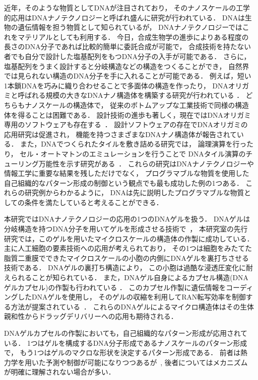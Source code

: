 近年，そのような物質としてDNAが注目されており，
そのナノスケールの工学的応用はDNAナノテクノロジーと呼ばれ盛んに研究が行われている．
DNAは生物の遺伝情報を担う物質として知られているが，
DNAナノテクノロジーではこれをマテリアルとしても利用する．
今日，合成生物学の進歩によりある程度の長さのDNA分子であれば比較的簡単に委託合成が可能で，
合成技術を持たない者でも自分で設計した塩基配列をもつDNA分子の入手が可能である．
さらに，塩基配列をうまく設計すると分岐構造などの構造をつくることができ，
自然界では見られない構造のDNA分子を手に入れることが可能である．
例えば，短い1本鎖DNAを巧みに織り合わせることで多面体の構造を作ったり\cite{chen1991synthesis}，
DNAオリガミと呼ばれる規模の大きなDNAナノ構造体を構築する研究が行われている
\cite{rothemund2006folding}．
どちらもナノスケールの構造体で，
従来のボトムアップな工業技術で同様の構造体を得ることは困難である．
設計技術の進歩も著しく，現在ではDNAオリガミ専用のソフトウェアも存在する~\cite{douglas2009rapid}．
設計ソフトウェアの存在でDNAオリガミの応用研究は促進され，
機能を持つさまざまなDNAナノ構造体が報告されている．
また，DNAでつくられたタイルを敷き詰める研究では\cite{winfree1998design}，
論理演算を行ったり\cite{mao2000logical}，
セル・オートマトンのエミュレーションを行うことで
DNAタイル演算のチューリング万能性を示す研究がある~\cite{rothemund2004algorithmic}．
これらの研究はDNAナノテクノロジーや情報工学に重要な結果を残しただけでなく，
プログラマブルな物質を使用した自己組織的なパターン形成の制御という観点でも最も成功した例の1つある．
これらの研究例からわかるように，
DNAは先に説明したプログラマブルな物質としての条件を満たしていると考えることができる．

本研究ではDNAナノテクノロジーの応用の1つのDNAゲルを扱う．
DNAゲルは分岐構造を持つDNA分子を用いてゲルを形成させる技術で~\cite{um2006enzyme}，
本研究室の先行研究では，このゲルを用いたマイクロスケールの構造体の作製に成功している．
主に人工細胞の要素技術への応用が考えられており，
その1つは細胞をみたてた脂質二重膜でできたマイクロスケールの小胞の内側にDNAゲルを裏打ちさせる技術である．
DNAゲルの裏打ち構造により，
この小胞は過酷な浸透圧変化に耐えられることが知られている\cite{kurokawa2017dna}．
また，DNAゲル自身によるカプセル構造(DNAゲルカプセル)の作製も行われている
\cite{morita2017formation}．
このカプセル作製に遺伝情報をコーディングしたDNAゲルを使用し，
そのゲルの収縮を利用してRAN転写効率を制御する方法が提案されている~\cite{watanabe}．
これらのDNAゲルによるマイクロ構造体はその生体親和性からドラッグデリバリーへの応用も期待される．

DNAゲルカプセルの作製においても，自己組織的なパターン形成が応用されている．
1つはゲルを構成するDNA分子形成であるナノスケールのパターン形成で，
もう1つはゲルのマクロな形状を決定するパターン形成である．
前者は熱力学を用いた予測や制御が可能になりつつあるが~\cite{zadeh2011nupack}, 
後者についてはメカニズムが明確に理解されない場合が多い．


